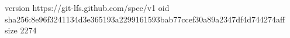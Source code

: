 version https://git-lfs.github.com/spec/v1
oid sha256:8e96f3241134d3e365193a2299161593bab77ccef30a89a2347df4d744274aff
size 2274
